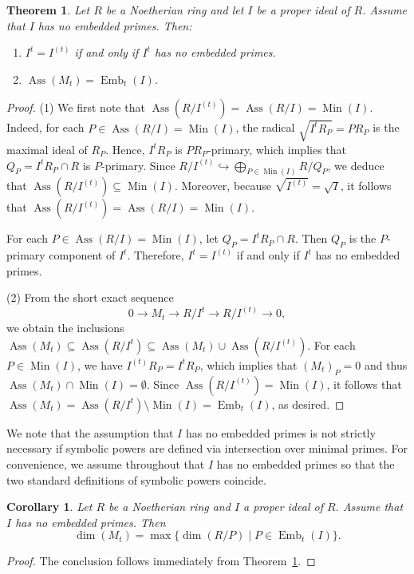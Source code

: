 \documentclass[12pt]{amsart}
\def\Min{\operatorname{Min}}
\def\Ass{\operatorname{Ass}}
\def\max{\operatorname{max}}
\def\Emb{\operatorname{Emb}}
\newtheorem{corollary}[lemma]{Corollary}
\newtheorem{theorem}[lemma]{Theorem}
\begin{document}
\begin{theorem}\label{thm_ass_M} 
Let $R$ be a Noetherian ring and let $I$ be a proper ideal of $R$. Assume that $I$ has no embedded primes. Then:
\begin{enumerate}
    \item $I^t = I^{(t)}$ if and only if $I^t$ has no embedded primes.
    \item $\operatorname{Ass}(M_t) = \operatorname{Emb}_t(I)$.
\end{enumerate}    
\end{theorem}
\begin{proof}
(1) We first note that $\Ass(R/I^{(t)}) = \Ass(R/I) = \Min(I)$. Indeed, for each $P \in \Ass(R/I) = \Min(I)$, the radical $\sqrt{I^t R_P} = PR_P$ is the maximal ideal of $R_P$. Hence, $I^t R_P$ is $PR_P$-primary, which implies that $Q_P = I^t R_P \cap R$ is $P$-primary. Since $R/I^{(t)} \hookrightarrow \bigoplus_{P \in \Min(I)} R/Q_P$, we deduce that $\Ass(R/I^{(t)}) \subseteq \Min(I)$. Moreover, because $\sqrt{I^{(t)}} = \sqrt{I}$, it follows that $\Ass(R/I^{(t)}) = \Ass(R/I) = \Min(I)$.

For each $P \in \Ass(R/I) = \Min(I)$, let $Q_P = I^t R_P \cap R$. Then $Q_P$ is the $P$-primary component of $I^t$. Therefore, $I^t = I^{(t)}$ if and only if $I^t$ has no embedded primes.

(2) From the short exact sequence 
$$0 \to M_t \to R/I^t \to R/I^{(t)} \to 0,$$
we obtain the inclusions $\Ass(M_t) \subseteq \Ass(R/I^t) \subseteq \Ass(M_t) \cup \Ass(R/I^{(t)})$. For each $P \in \Min(I)$, we have $I^{(t)} R_P = I^t R_P$, which implies that $(M_t)_P = 0$ and thus $\Ass(M_t) \cap \Min(I) = \emptyset$. Since $\Ass(R/I^{(t)}) = \Min(I)$, it follows that $\Ass(M_t) = \Ass(R/I^t) \setminus \Min(I) = \Emb_t(I)$, as desired.
\end{proof}


We note that the assumption that $I$ has no embedded primes is not strictly necessary if symbolic powers are defined via intersection over minimal primes. For convenience, we assume throughout that $I$ has no embedded primes so that the two standard definitions of symbolic powers coincide.

\begin{corollary}
Let $R$ be a Noetherian ring and $I$ a proper ideal of $R$. Assume that $I$ has no embedded primes. Then 
$$\dim(M_t) = \max \{ \dim(R/P) \mid P \in \operatorname{Emb}_t(I) \}.$$
\end{corollary}
\begin{proof}
The conclusion follows immediately from Theorem~\ref{thm_ass_M}.
\end{proof}
\end{document}
